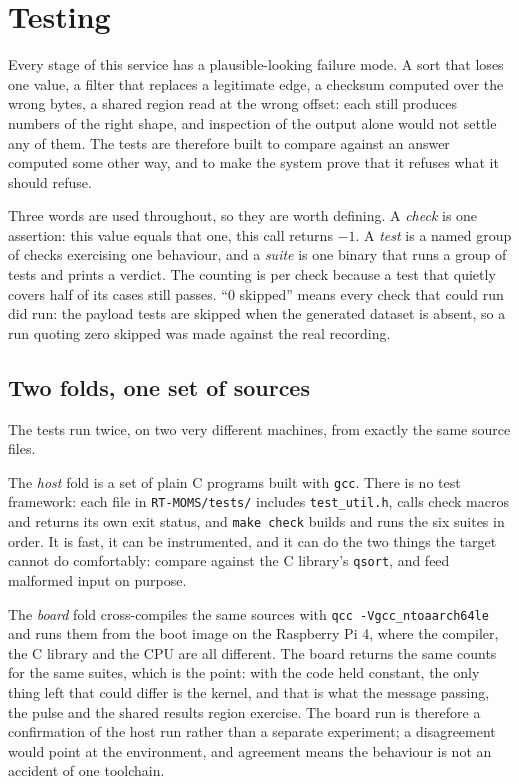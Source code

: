 \documentclass[12pt,a4paper,oneside]{report}
\begin{document}
\section{Testing}
\label{sec:testing}

Every stage of this service has a plausible-looking failure mode. A sort that
loses one value, a filter that replaces a legitimate edge, a checksum computed
over the wrong bytes, a shared region read at the wrong offset: each still
produces numbers of the right shape, and inspection of the output alone would not
settle any of them. The tests are therefore built to compare against an answer
computed some other way, and to make the system prove that it refuses what it
should refuse.

Three words are used throughout, so they are worth defining. A \emph{check} is one
assertion: this value equals that one, this call returns $-1$. A \emph{test} is
a named group of checks exercising one behaviour, and a \emph{suite} is one binary
that runs a group of tests and prints a verdict. The counting is per check because
a test that quietly covers half of its cases still passes. ``0 skipped'' means
every check that could run did run: the payload tests are skipped when the
generated dataset is absent, so a run quoting zero skipped was made against the
real recording.

\subsection{Two folds, one set of sources}

The tests run twice, on two very different machines, from exactly the same source
files.

The \emph{host} fold is a set of plain C programs built with \texttt{gcc}. There is
no test framework: each file in \texttt{RT-MOMS/tests/} includes
\texttt{test\_util.h}, calls check macros and returns its own exit status, and
\texttt{make check} builds and runs the six suites in order. It is fast, it can be
instrumented, and it can do the two things the target cannot do comfortably:
compare against the C library's \texttt{qsort}, and feed malformed input on
purpose.

The \emph{board} fold cross-compiles the same sources with
\texttt{qcc -Vgcc\_ntoaarch64le} and runs them from the boot image on the
Raspberry Pi 4, where the compiler, the C library and the CPU are all different.
The board returns the same counts for the same suites, which is the point: with
the code held constant, the only thing left that could differ is the kernel, and
that is what the message passing, the pulse and the shared results region
exercise. The board run is therefore a confirmation of the host run rather than a
separate experiment; a disagreement would point at the environment, and
agreement means the behaviour is not an accident of one toolchain.
\end{document}
